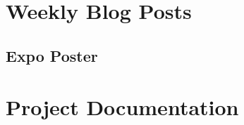 \documentclass[draftclsnofoot,onecolumn,journal,letterpaper,compsoc,10pt]{IEEEtran}
\begin{document}
\clearpage
\newpage
\section{Weekly Blog Posts}


\begin{landscape}
    \section{Expo Poster}
    \begin{center}
    \end{center}
\end{landscape}

%

\newpage
\section{Project Documentation}


\newpage
\end{document}
